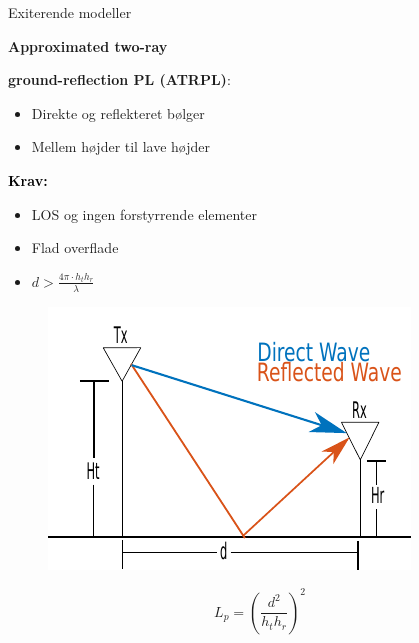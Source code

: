 \begin{frame}{Exiterende modeller}
\begin{minipage}{.45\textwidth}
\raggedright\textcolor{thomasred}{\textbf{Approximated two-ray}}\\
\raggedright\textcolor{thomasred}{\textbf{ground-reflection PL (ATRPL)}:}
\begin{itemize}
\item Direkte og reflekteret bølger
\item Mellem højder til lave højder
\end{itemize} 

\vspace{1em}
\textcolor{black}{\textbf{Krav:}}
\begin{itemize}
\item LOS og ingen forstyrrende elementer
\item Flad overflade
\item $d > \frac{4\pi \cdot h_t h_r }{\lambda}$
\end{itemize}

\end{minipage}
\begin{minipage}{0.5\textwidth}
\begin{figure}[!htbp]
 \centering
  \includegraphics[width = \columnwidth]{figures/two_ray_illu.pdf}
  \end{figure}
\end{minipage}

\vspace{1em}
\begin{equation*}
L_{p} = \left(\frac{d^2}{h_t h_r}\right)^2
\label{two_ray_model}
\end{equation*}
\end{frame}


